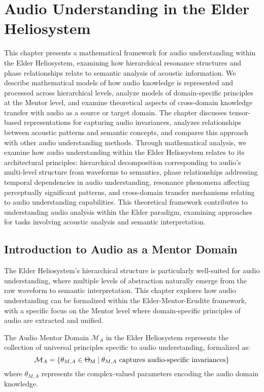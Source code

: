 \chapter{Audio Understanding in the Elder Heliosystem}

\begin{tcolorbox}[colback=blue!5!white,colframe=blue!75!black,title=Chapter Summary]
This chapter presents a mathematical framework for audio understanding within the Elder Heliosystem, examining how hierarchical resonance structures and phase relationships relate to semantic analysis of acoustic information. We describe mathematical models of how audio knowledge is represented and processed across hierarchical levels, analyze models of domain-specific principles at the Mentor level, and examine theoretical aspects of cross-domain knowledge transfer with audio as a source or target domain. The chapter discusses tensor-based representations for capturing audio invariances, analyzes relationships between acoustic patterns and semantic concepts, and compares this approach with other audio understanding methods. Through mathematical analysis, we examine how audio understanding within the Elder Heliosystem relates to its architectural principles: hierarchical decomposition corresponding to audio's multi-level structure from waveforms to semantics, phase relationships addressing temporal dependencies in audio understanding, resonance phenomena affecting perceptually significant patterns, and cross-domain transfer mechanisms relating to audio understanding capabilities. This theoretical framework contributes to understanding audio analysis within the Elder paradigm, examining approaches for tasks involving acoustic analysis and semantic interpretation.
\end{tcolorbox}

\section{Introduction to Audio as a Mentor Domain}

The Elder Heliosystem's hierarchical structure is particularly well-suited for audio understanding, where multiple levels of abstraction naturally emerge from the raw waveform to semantic interpretation. This chapter explores how audio understanding can be formalized within the Elder-Mentor-Erudite framework, with a specific focus on the Mentor level where domain-specific principles of audio are extracted and unified.

\begin{definition}
The Audio Mentor Domain $\mathcal{M}_A$ in the Elder Heliosystem represents the collection of universal principles specific to audio understanding, formalized as:
\begin{equation}
\mathcal{M}_A = \{\theta_{M,A} \in \Theta_{\text{M}} \mid \theta_{M,A} \text{ captures audio-specific invariances}\}
\end{equation}
where $\theta_{M,A}$ represents the complex-valued parameters encoding the audio domain knowledge.
\end{definition}

